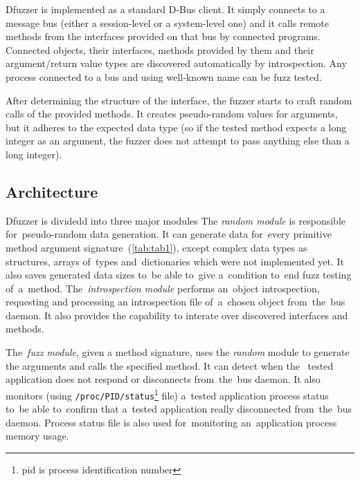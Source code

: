 \documentclass[conference]{IEEEtran}
\begin{document}
Dfuzzer is implemented as a standard D-Bus client. It simply connects to a
message bus (either a session-level or a system-level one) and it calls remote
methods from the interfaces provided on that bus by connected programs.
Connected objects, their interfaces, methods provided by them and their
argument/return value types are discovered automatically by introspection. Any process connected to a bus and using well-known name can be fuzz tested.

After determining the structure of the interface, the fuzzer starts to craft
random calls of the provided methods. It creates pseudo-random values for
arguments, but it adheres to the expected data type (so if the tested method
expects a long integer as an argument, the fuzzer does not attempt to pass
anything else than a long integer).

\subsection{Architecture}
Dfuzzer is dividedd into three major modules The \emph{random module} is
responsible for~pseudo-random data generation. It can generate data for~every
primitive method argument signature~(\ref{tab:tab1}), except complex data types
as structures, arrays of~types and~dictionaries which were not implemented yet.
It also saves generated data sizes to~be able to~give a~condition to~end fuzz
testing of~a~method. The~\emph{introspection module} performs an~object
introspection, requesting and processing an introspection file of~a~chosen
object from~the~bus daemon. It also provides the capability to interate over
discovered interfaces and methods. 

The~\emph{fuzz module}, given a method signature, uses the \emph{random} module
to generate the arguments and calls the specified method. It can detect when
the ~tested application does not respond or disconnects from~the~bus daemon.
It also monitors (using \texttt{/proc/PID/status}\footnote{pid is process
identification number} file) a~tested application process status to~be able
to~confirm that a~tested application really disconnected from~the~bus daemon.
Process status file is also used for~monitoring an~application process memory
usage.
\end{document}
